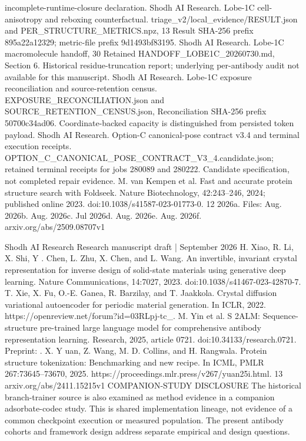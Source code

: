 \documentclass[11pt]{article}
\begin{document}
incomplete-runtime-closure declaration.
Shodh AI Research. Lobe-1C cell-anisotropy and reboxing counterfactual.
triage\_v2/local\_evidence/RESULT.json and PER\_STRUCTURE\_METRICS.npz, 13
Result SHA-256 prefix 895a22a12329; metric-file prefix 9d1493bf83195.
Shodh AI Research. Lobe-1C macromolecule handoff, 30 Retained
HANDOFF\_LOBE1C\_20260730.md, Section 6. Historical residue-truncation report; underlying
per-antibody audit not available for this manuscript.
Shodh AI Research. Lobe-1C exposure reconciliation and source-retention census.
EXPOSURE\_RECONCILIATION.json and SOURCE\_RETENTION\_CENSUS.json,
Reconciliation SHA-256 prefix 50700c34ad06. Coordinate-backed capacity is distinguished from
persisted token payload.
Shodh AI Research. Option-C canonical-pose contract v3.4 and terminal execution receipts.
OPTION\_C\_CANONICAL\_POSE\_CONTRACT\_V3\_4.candidate.json; retained terminal receipts
for jobs 280089 and 280222. Candidate specification, not completed repair evidence.
M. van Kempen et al. Fast and accurate protein structure search with Foldseek. Nature Biotechnology,
42:243–246, 2024; published online 2023. doi:10.1038/s41587-023-01773-0.
12
2026a. Files:
Aug. 2026b.
Aug. 2026c.
Jul 2026d.
Aug. 2026e.
Aug. 2026f.
arxiv.org/abs/2509.08707v1

Shodh AI Research Research manuscript draft | September 2026
H. Xiao, R. Li, X. Shi, Y . Chen, L. Zhu, X. Chen, and L. Wang. An invertible, invariant crystal representation
for inverse design of solid-state materials using generative deep learning. Nature Communications,
14:7027, 2023. doi:10.1038/s41467-023-42870-7.
T. Xie, X. Fu, O.-E. Ganea, R. Barzilay, and T. Jaakkola. Crystal diffusion variational autoencoder for periodic
material generation. In ICLR, 2022. https://openreview.net/forum?id=03RLpj-tc\_.
M. Yin et al. S 2ALM: Sequence-structure pre-trained large language model for comprehensive antibody
representation learning. Research, 2025, article 0721. doi:10.34133/research.0721. Preprint:
.
X. Y uan, Z. Wang, M. D. Collins, and H. Rangwala. Protein structure tokenization: Benchmarking and new
recipe. In ICML, PMLR 267:73645–73670, 2025.
https://proceedings.mlr.press/v267/yuan25i.html.
13
arxiv.org/abs/2411.15215v1
COMPANION-STUDY DISCLOSURE
The historical branch-trainer source is also examined as method evidence in a companion
adsorbate-codec study. This is shared implementation lineage, not evidence of a common
checkpoint execution or measured population. The present antibody cohorts and framework design
address separate empirical and design questions.
\end{document}
